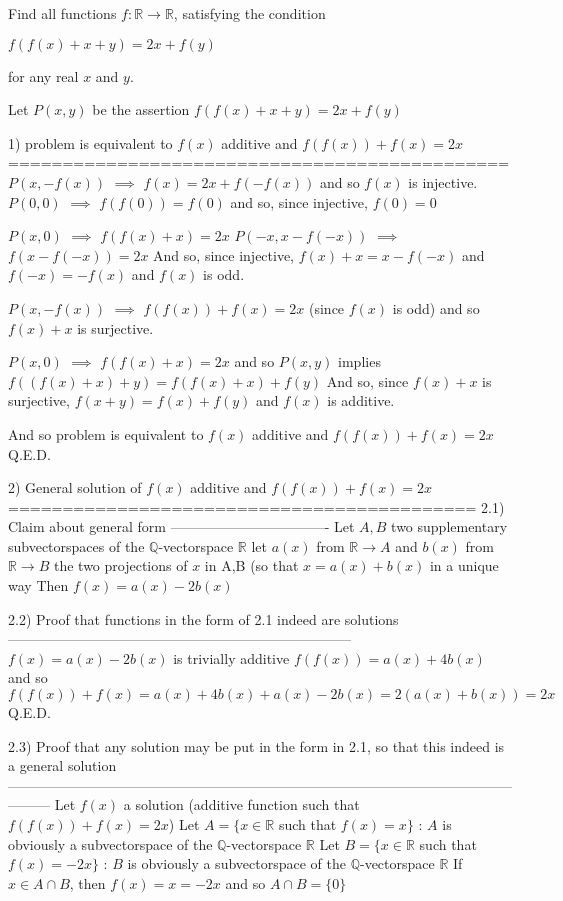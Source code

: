 \begin{solution}
	\begin{tcolorbox}Find all functions $f :\mathbb{R}\to\mathbb{R}$, satisfying the condition

$f(f(x)+x+y)=2x+f(y)$

for any real $x$ and $y$.\end{tcolorbox}
Let $P(x,y)$ be the assertion $f(f(x)+x+y)=2x+f(y)$

1) problem is equivalent to $f(x)$ additive and $f(f(x))+f(x)=2x$
==============================================
$P(x,-f(x))$ $\implies$ $f(x)=2x+f(-f(x))$ and so $f(x)$ is injective.
$P(0,0)$ $\implies$ $f(f(0))=f(0)$ and so, since injective, $f(0)=0$

$P(x,0)$ $\implies$ $f(f(x)+x)=2x$
$P(-x,x-f(-x))$ $\implies$ $f(x-f(-x))=2x$
And so, since injective, $f(x)+x=x-f(-x)$ and $f(-x)=-f(x)$ and $f(x)$ is odd.

$P(x,-f(x))$ $\implies$ $f(f(x))+f(x)=2x$ (since $f(x)$ is odd) and so $f(x)+x$ is surjective.

$P(x,0)$ $\implies$ $f(f(x)+x)=2x$ and so $P(x,y)$ implies $f((f(x)+x)+y)=f(f(x)+x)+f(y)$
And so, since $f(x)+x$ is surjective, $f(x+y)=f(x)+f(y)$ and $f(x)$ is additive.

And so problem is equivalent to $f(x)$ additive and $f(f(x))+f(x)=2x$
Q.E.D.

2) General solution of $f(x)$ additive and $f(f(x))+f(x)=2x$
===========================================
2.1) Claim about general form
----------------------------------
Let $A,B$ two supplementary subvectorspaces of the $\mathbb Q$-vectorspace $\mathbb R$
let $a(x)$ from $\mathbb R\to A$ and $b(x)$ from $\mathbb R\to B$ the two projections of $x$ in A,B (so that $x=a(x)+b(x)$ in a unique way
Then $f(x)=a(x)-2b(x)$

2.2) Proof that functions in the form of 2.1 indeed are solutions
--------------------------------------------------------------------------
$f(x)=a(x)-2b(x)$ is trivially additive
$f(f(x))=a(x)+4b(x)$ and so $f(f(x))+f(x)=a(x)+4b(x)+a(x)-2b(x)=2(a(x)+b(x))=2x$
Q.E.D.

2.3) Proof that any solution may be put in the form in 2.1, so that this indeed is a general solution
---------------------------------------------------------------------------------------------------------------------
Let $f(x)$ a solution (additive function such that $f(f(x))+f(x)=2x$)
Let $A=\{x\in\mathbb R$ such that $f(x)=x\}$ : $A$ is obviously a subvectorspace of the $\mathbb Q$-vectorspace $\mathbb R$
Let $B=\{x\in\mathbb R$ such that $f(x)=-2x\}$ : $B$ is obviously a subvectorspace of the $\mathbb Q$-vectorspace $\mathbb R$
If $x\in A\cap B$, then $f(x)=x=-2x$ and so $A\cap B=\{0\}$


\end{solution}
